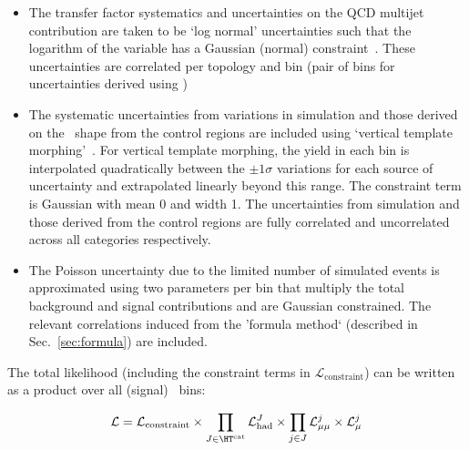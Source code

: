 \begin{itemize}
\item The transfer factor systematics and uncertainties on the QCD multijet contribution 
are taken to be `log normal' uncertainties such that the logarithm of the variable has 
a Gaussian (normal) constraint~\cite{templateMorphing}. These uncertainties are correlated per topology and \scalht bin 
(pair of \scalht bins for uncertainties derived using \mmj)
\item The systematic uncertainties from variations in simulation and those derived on the \mht~shape from the control regions 
are included using `vertical template morphing'~\cite{templateMorphing}. For vertical template morphing, the yield
in each bin is interpolated quadratically between the $\pm 1\sigma$ variations for each source of
uncertainty and extrapolated linearly beyond this range. The constraint term is Gaussian
with mean 0 and width 1. The uncertainties from simulation and those derived from the control regions
are fully correlated and uncorrelated across all categories respectively.
\item The Poisson uncertainty due to the limited number of simulated events is approximated using
two parameters per bin that multiply the total background and signal contributions and 
are Gaussian constrained. The relevant correlations induced from the 'formula method` (described in Sec.~\ref{sec:formula}) 
are included. 
\end{itemize}

The total likelihood (including the constraint terms in $\mathcal{L}_\mathrm{constraint}$) 
can be written as a product over all (signal) \htcat~bins:

\begin{equation}
\label{eq:totalLikelihood}
\mathcal{L} =  \mathcal{L}_\mathrm{constraint} \times \prod_{J\in\htcat} \mathcal{L}^{J}_{\mathrm{had}} \times  \prod_{j\in J} \mathcal{L}^{j}_{\mu\mu} 
\times \mathcal{L}^{j}_{\mu}
\end{equation}


